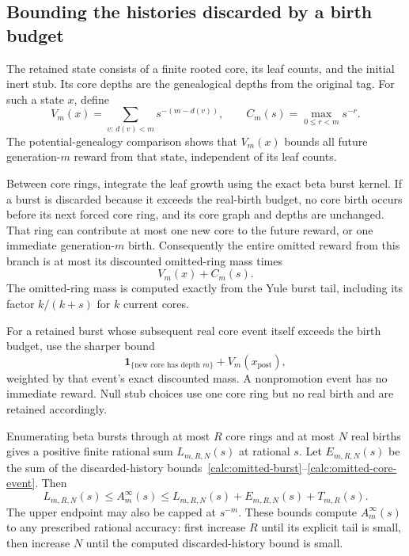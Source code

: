 \subsection{Bounding the histories discarded by a birth budget}

The retained state consists of a finite rooted core, its leaf counts,
and the initial inert stub. Its core depths are the genealogical
depths from the original tag. For such a state $x$, define
\begin{equation}\label{calc:future-reward}
 V_m(x)=\sum_{v:\,d(v)<m}s^{-(m-d(v))},
 \qquad C_m(s)=\max_{0\le r<m}s^{-r}.
\end{equation}
The potential-genealogy comparison shows that $V_m(x)$ bounds all
future generation-$m$ reward from that state, independent of its
leaf counts.

Between core rings, integrate the leaf growth using the exact beta
burst kernel. If a burst is discarded because it exceeds the real-birth
budget, no core birth occurs before its next forced core ring, and its
core graph and depths are unchanged. That ring can contribute at most
one new core to the future reward, or one immediate generation-$m$
birth. Consequently the entire omitted reward from this branch is at
most its discounted omitted-ring mass times
\begin{equation}\label{calc:omitted-burst}
 V_m(x)+C_m(s).
\end{equation}
The omitted-ring mass is computed exactly from the Yule burst tail,
including its factor $k/(k+s)$ for $k$ current cores.

For a retained burst whose subsequent real core event itself exceeds
the birth budget, use the sharper bound
\begin{equation}\label{calc:omitted-core-event}
 \mathbf1_{\{\text{new core has depth }m\}}+V_m(x_{\mathrm{post}}),
\end{equation}
weighted by that event's exact discounted mass. A nonpromotion event
has no immediate reward. Null stub choices use one core ring but no
real birth and are retained accordingly.

\begin{proposition}\label{calc:calculator}
Enumerating beta bursts through at most $R$ core rings and at most $N$
real births gives a positive finite rational sum $L_{m,R,N}(s)$ at
rational $s$. Let $E_{m,R,N}(s)$ be the sum of the discarded-history
bounds~\eqref{calc:omitted-burst}--\eqref{calc:omitted-core-event}. Then
\begin{equation}\label{calc:interval}
 L_{m,R,N}(s)\le A_m^\infty(s)
 \le L_{m,R,N}(s)+E_{m,R,N}(s)+T_{m,R}(s).
\end{equation}
The upper endpoint may also be capped at $s^{-m}$. These bounds compute
$A_m^\infty(s)$ to any prescribed rational accuracy: first increase
$R$ until its explicit tail is small, then increase $N$ until the
computed discarded-history bound is small.
\end{proposition}

